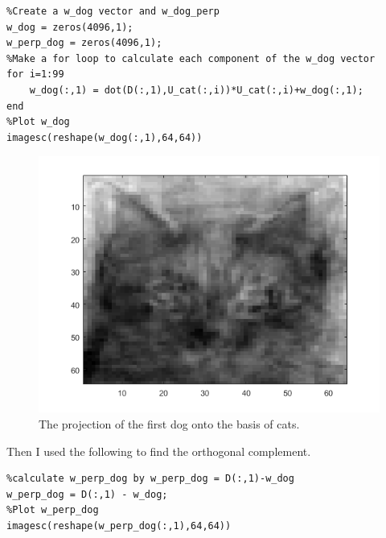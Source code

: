 \documentclass[leqno]{article}
\theoremstyle{nonumberplain}
\begin{document}
\begin{lstlisting}
%Create a w_dog vector and w_dog_perp
w_dog = zeros(4096,1);
w_perp_dog = zeros(4096,1);
%Make a for loop to calculate each component of the w_dog vector
for i=1:99
    w_dog(:,1) = dot(D(:,1),U_cat(:,i))*U_cat(:,i)+w_dog(:,1);
end
%Plot w_dog
imagesc(reshape(w_dog(:,1),64,64))
\end{lstlisting}

\begin{figure}[h]
\begin{center}
\includegraphics[scale=.4]{w_dog.png}
\caption{The projection of the first dog onto the basis of cats.}
\end{center}
\end{figure}

Then I used the following to find the orthogonal complement.

\begin{lstlisting}
%calculate w_perp_dog by w_perp_dog = D(:,1)-w_dog
w_perp_dog = D(:,1) - w_dog;
%Plot w_perp_dog
imagesc(reshape(w_perp_dog(:,1),64,64))
\end{lstlisting}
\end{document}

